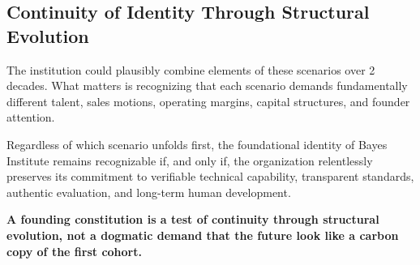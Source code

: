 \subsection{Continuity of Identity Through Structural Evolution}

The institution could plausibly combine elements of these scenarios over 2 decades. What matters is recognizing that each scenario demands fundamentally different talent, sales motions, operating margins, capital structures, and founder attention.

Regardless of which scenario unfolds first, the foundational identity of Bayes Institute remains recognizable if, and only if, the organization relentlessly preserves its commitment to verifiable technical capability, transparent standards, authentic evaluation, and long-term human development.

\textbf{A founding constitution is a test of continuity through structural evolution, not a dogmatic demand that the future look like a carbon copy of the first cohort.}
